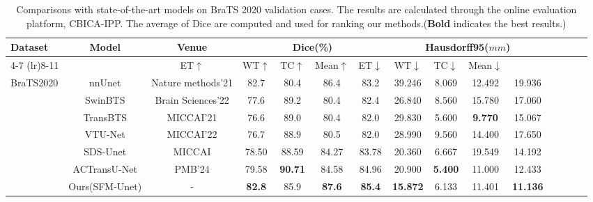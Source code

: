 \documentclass[AMA,Times1COL]{WileyNJDv5} %
\begin{document}
\begin{table}[htbp]
\centering
\scriptsize
\caption{Comparisons with state-of-the-art models on BraTS 2020 validation cases. The results are calculated through the online evaluation platform, CBICA-IPP. The average of Dice are computed and used for ranking our methods.(\textbf{Bold} indicates the best results.)}
\begin{tabular}{lcccccccccccccc}
\toprule
\multirow{2}{*}{Dataset} & \multirow{2}{*}{Model}& \multirow{2}{*}{Venue} & \multicolumn{4}{c}{Dice(\%)} & \multicolumn{4}{c}{Hausdorff95($mm$)} \\ 
\cmidrule(lr){4-7} \cmidrule(lr){8-11}
 & & ET$\uparrow$ & WT$\uparrow$ & TC$\uparrow$ & Mean$\uparrow$ & ET$\downarrow$ & WT$\downarrow$ & TC$\downarrow$ & Mean$\downarrow$ \\ 
\midrule
BraTS2020 & nnUnet\cite{isensee2018nnu}&Nature methods'21 & 82.7 & 80.4 & 86.4 & 83.2 & 39.246 & 8.069 & 12.492 & 19.936 \\ 
 & SwinBTS\cite{jiang2022swinbts}&Brain Sciences'22 & 77.6 & 89.2 & 80.4 & 82.4 & 26.840 & 8.560 & 15.780 & 17.060 \\ 
 & TransBTS\cite{wenxuan2021transbts}&MICCAI'21 & 76.6 & 89.0 & 80.4 & 82.0 & 29.830 & 5.600 & \textbf{9.770} & 15.067 \\ 
 & VTU-Net\cite{peiris2022VTU}&MICCAI'22 & 76.7 & 88.9 & 80.5 & 82.0 & 28.990 & 9.560 & 14.400 & 17.650 \\ 
 & SDS-Unet\cite{henry2021brain}&MICCAI &  78.50 & 88.59 & 84.27 & 83.78 & 20.360 & 6.667 & 19.549 & 14.192 \\ 
 & ACTransU-Net\cite{chen2024adaptive}&PMB'24 &  79.58 & \textbf{90.71} &  84.58 &  84.96 & 20.900 & \textbf{5.400} & 11.000 & 12.433 \\ 
 & Ours(SFM-Unet)&- & \textbf{82.8} & 85.9 & \textbf{87.6} & \textbf{85.4} & \textbf{15.872} & 6.133 & 11.401 & \textbf{11.136} \\ 
\bottomrule
\end{tabular}
\label{tab:sota}
\end{table}

\end{document}
